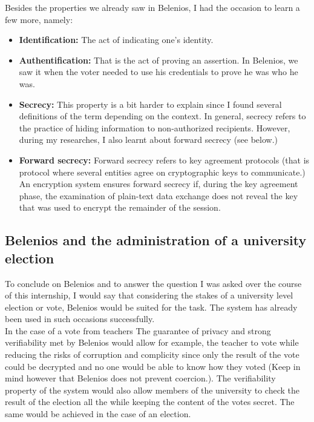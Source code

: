 \documentclass[12pt, a4paper]{report}
\begin{document}
Besides the properties we already saw in Belenios, I had the occasion to learn a few more, namely:

\begin{itemize}

\item \textbf{Identification:} The act of indicating one's identity. 

\item \textbf{Authentification:} That is the act of proving an assertion. In Belenios, we saw it when the voter needed to use his credentials to prove he was who he was.

\item \textbf{Secrecy:} This property is a bit harder to explain since I found several definitions of the term depending on the context. In general, secrecy refers to the practice of hiding information to non-authorized recipients. However, during my researches, I also learnt about forward secrecy (see below.)

\item \textbf{Forward secrecy:} Forward secrecy refers to key agreement protocols (that is protocol where several entities agree on cryptographic keys to communicate.) An encryption system ensures forward secrecy if, during the key agreement phase, the examination of plain-text data exchange does not reveal the key that was used to encrypt the remainder of the session.

\end{itemize}

\subsection{Belenios and the administration of a university election}

To conclude on Belenios and to answer the question I was asked over the course of this internship, I would say that considering the stakes of a university level election or vote, Belenios would be suited for the task. The system has already been used in such occasions successfully.\\ 

In the case of a vote from teachers The guarantee of privacy and strong verifiability met by Belenios would allow for example, the teacher to vote while reducing the risks of corruption and complicity since only the result of the vote could be decrypted and no one would be able to know how they voted (Keep in mind however that Belenios does not prevent coercion.). The verifiability property of the system would also allow members of the university to check the result of the election all the while keeping the content of the votes secret. The same would be achieved in the case of an election.\\
\end{document}
